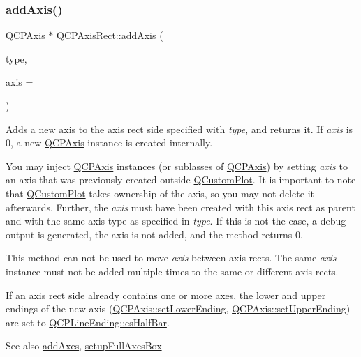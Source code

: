 \subsubsection{\texorpdfstring{add\+Axis()}{addAxis()}}
{\footnotesize\ttfamily \mbox{\hyperlink{class_q_c_p_axis}{Q\+C\+P\+Axis}} $\ast$ Q\+C\+P\+Axis\+Rect\+::add\+Axis (\begin{DoxyParamCaption}\item[{\mbox{\hyperlink{class_q_c_p_axis_ae2bcc1728b382f10f064612b368bc18a}{Q\+C\+P\+Axis\+::\+Axis\+Type}}}]{type,  }\item[{\mbox{\hyperlink{class_q_c_p_axis}{Q\+C\+P\+Axis}} $\ast$}]{axis = {} }\end{DoxyParamCaption})}

Adds a new axis to the axis rect side specified with {\itshape type}, and returns it. If {\itshape axis} is 0, a new \mbox{\hyperlink{class_q_c_p_axis}{Q\+C\+P\+Axis}} instance is created internally.

You may inject \mbox{\hyperlink{class_q_c_p_axis}{Q\+C\+P\+Axis}} instances (or sublasses of \mbox{\hyperlink{class_q_c_p_axis}{Q\+C\+P\+Axis}}) by setting {\itshape axis} to an axis that was previously created outside \mbox{\hyperlink{class_q_custom_plot}{Q\+Custom\+Plot}}. It is important to note that \mbox{\hyperlink{class_q_custom_plot}{Q\+Custom\+Plot}} takes ownership of the axis, so you may not delete it afterwards. Further, the {\itshape axis} must have been created with this axis rect as parent and with the same axis type as specified in {\itshape type}. If this is not the case, a debug output is generated, the axis is not added, and the method returns 0.

This method can not be used to move {\itshape axis} between axis rects. The same {\itshape axis} instance must not be added multiple times to the same or different axis rects.

If an axis rect side already contains one or more axes, the lower and upper endings of the new axis (\mbox{\hyperlink{class_q_c_p_axis_a08af1c72db9ae4dc8cb8a973d44405ab}{Q\+C\+P\+Axis\+::set\+Lower\+Ending}}, \mbox{\hyperlink{class_q_c_p_axis_a69119b892fc306f651763596685aa377}{Q\+C\+P\+Axis\+::set\+Upper\+Ending}}) are set to \mbox{\hyperlink{class_q_c_p_line_ending_a5ef16e6876b4b74959c7261d8d4c2cd5a126c390f0c359fcd8df1fc5e38d26d5b}{Q\+C\+P\+Line\+Ending\+::es\+Half\+Bar}}.

\begin{DoxySeeAlso}{See also}
\mbox{\hyperlink{class_q_c_p_axis_rect_a792e1f3d9cb1591fca135bb0de9b81fc}{add\+Axes}}, \mbox{\hyperlink{class_q_c_p_axis_rect_a5fa906175447b14206954f77fc7f1ef4}{setup\+Full\+Axes\+Box}} 
\end{DoxySeeAlso}
\mbox{\label{class_q_c_p_axis_rect_a8db4722cb93e9c4a6f0d91150c200867}} 
